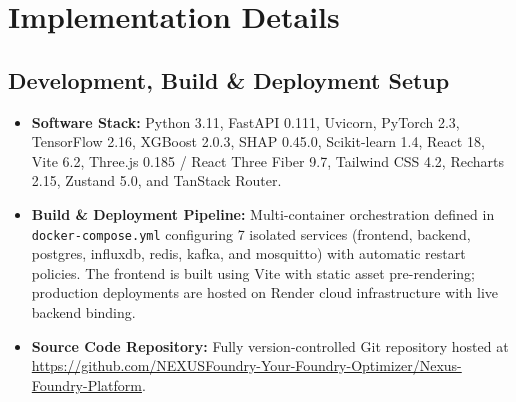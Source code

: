 \documentclass[11pt, a4paper]{article}
\begin{document}
\section{Implementation Details}

\subsection{Development, Build \& Deployment Setup}
\begin{itemize}[noitemsep, topsep=2pt]
    \item \textbf{Software Stack:} Python 3.11, FastAPI 0.111, Uvicorn, PyTorch 2.3, TensorFlow 2.16, XGBoost 2.0.3, SHAP 0.45.0, Scikit-learn 1.4, React 18, Vite 6.2, Three.js 0.185 / React Three Fiber 9.7, Tailwind CSS 4.2, Recharts 2.15, Zustand 5.0, and TanStack Router.
    \item \textbf{Build \& Deployment Pipeline:} Multi-container orchestration defined in \texttt{docker-compose.yml} configuring 7 isolated services (frontend, backend, postgres, influxdb, redis, kafka, and mosquitto) with automatic restart policies. The frontend is built using Vite with static asset pre-rendering; production deployments are hosted on Render cloud infrastructure with live backend binding.
    \item \textbf{Source Code Repository:} Fully version-controlled Git repository hosted at \url{https://github.com/NEXUSFoundry-Your-Foundry-Optimizer/Nexus-Foundry-Platform}.
\end{itemize}
\end{document}
